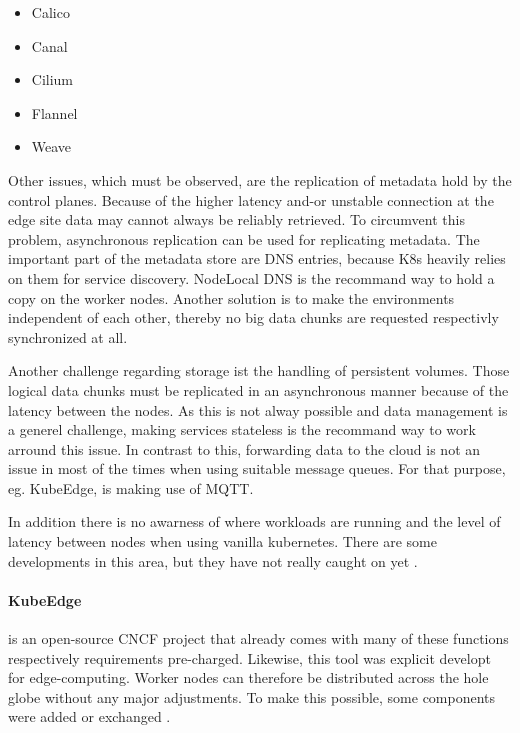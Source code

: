\documentclass[MSC,Master,english]{twbook}%
\begin{document}
\begin{itemize}
    \itemsep0em
    \item Calico
    \item Canal
    \item Cilium
    \item Flannel
    \item Weave
\end{itemize}

Other issues, which must be observed, are the replication of metadata hold by the control planes. Because of the higher latency and-or unstable connection at the edge site data may cannot always be reliably retrieved. To circumvent this problem, asynchronous replication can be used for replicating metadata. The important part of the metadata store are \ac{DNS} entries, because \ac{K8s} heavily relies on them for service discovery. NodeLocal DNS is the recommand way \cite{k8sdnslocal} to hold a copy on the worker nodes. Another solution is to make the environments independent of each other, thereby no big data chunks are requested respectivly synchronized at all.

Another challenge regarding storage ist the handling of persistent volumes. Those logical data chunks must be replicated in an asynchronous manner because of the latency between the nodes. As this is not alway possible and data management is a generel challenge, making services stateless is the recommand way to work arround this issue. In contrast to this, forwarding data to the cloud is not an issue in most of the times when using suitable message queues. For that purpose, eg. KubeEdge, is making use of \ac{MQTT}.  

In addition there is no awarness of where workloads are running and the level of latency between nodes when using vanilla kubernetes. There are some developments in this area, but they have not really caught on yet \cite{k8s-sharping-edge}\cite{tk-k8s-edge-scheduler}\cite{5g-k8s-scheduler}.

\paragraph{KubeEdge} is an open-source \ac{CNCF} project \cite{hal-kubeedge} that already comes with many of these functions respectively requirements pre-charged. Likewise, this tool was explicit developt for edge-computing. Worker nodes can therefore be distributed across the hole globe without any major adjustments. To make this possible, some components were added or exchanged \cite{kubedge}.
\end{document}
